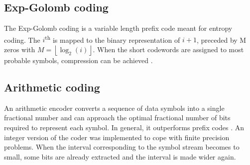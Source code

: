 \subsection{Exp-Golomb coding}

The Exp-Golomb coding is a variable length prefix code meant for entropy coding. The $i$\textsuperscript{th} is mapped to the binary representation of $i+1$, preceded by M zeros with $M=\left \lfloor{\log_2(i)}\right \rfloor $. When the short codewords are assigned to most probable symbols, compression can be achieved \cite{H264}.

\subsection{Arithmetic coding}

An arithmetic encoder converts a sequence of data symbols into a single fractional number and can approach the optimal fractional number of bits required to represent each symbol. In general, it outperforms prefix codes \cite{H264}. An integer version of the coder was implemented to cope with finite precision problems. When the interval corresponding to the symbol stream becomes to small, some bits are already extracted and the interval is made wider again.